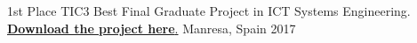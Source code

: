 
\begin{cvhonors}

\cvhonor
    {1st Place} %
    {TIC3 Best Final Graduate Project in ICT Systems Engineering.\href{https://upcommons.upc.edu/handle/2117/116397}{ \textbf{Download the project here}.}} %
    {Manresa, Spain} %
    {2017} %

\end{cvhonors}
